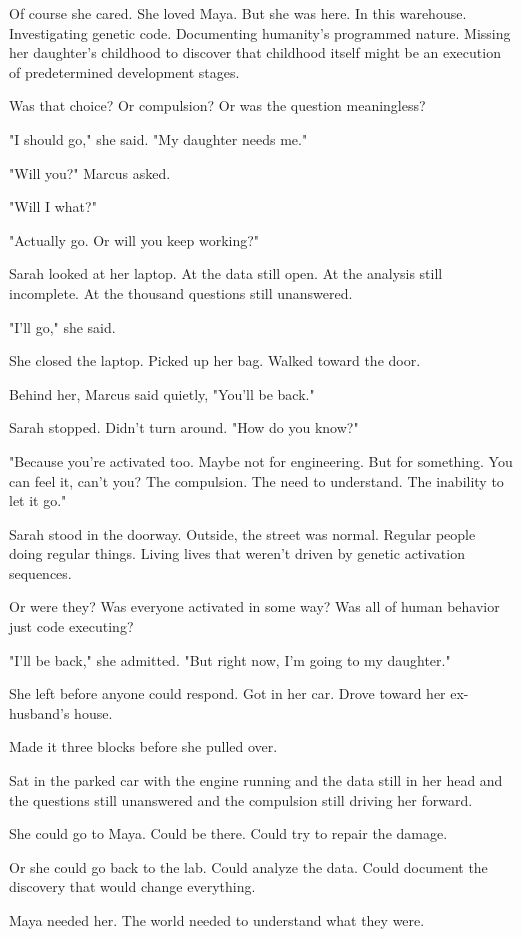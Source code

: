 Of course she cared. She loved Maya. But she was here. In this warehouse. Investigating genetic code. Documenting humanity's programmed nature. Missing her daughter's childhood to discover that childhood itself might be an execution of predetermined development stages.

Was that choice? Or compulsion? Or was the question meaningless?

"I should go," she said. "My daughter needs me."

"Will you?" Marcus asked.

"Will I what?"

"Actually go. Or will you keep working?"

Sarah looked at her laptop. At the data still open. At the analysis still incomplete. At the thousand questions still unanswered.

"I'll go," she said.

She closed the laptop. Picked up her bag. Walked toward the door.

Behind her, Marcus said quietly, "You'll be back."

Sarah stopped. Didn't turn around. "How do you know?"

"Because you're activated too. Maybe not for engineering. But for something. You can feel it, can't you? The compulsion. The need to understand. The inability to let it go."

Sarah stood in the doorway. Outside, the street was normal. Regular people doing regular things. Living lives that weren't driven by genetic activation sequences.

Or were they? Was everyone activated in some way? Was all of human behavior just code executing?

"I'll be back," she admitted. "But right now, I'm going to my daughter."

She left before anyone could respond. Got in her car. Drove toward her ex-husband's house.

Made it three blocks before she pulled over.

Sat in the parked car with the engine running and the data still in her head and the questions still unanswered and the compulsion still driving her forward.

She could go to Maya. Could be there. Could try to repair the damage.

Or she could go back to the lab. Could analyze the data. Could document the discovery that would change everything.

Maya needed her. The world needed to understand what they were.

